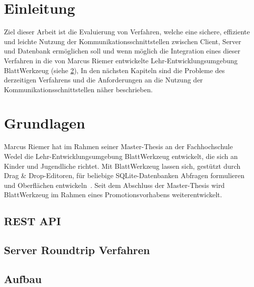
\chapter{Einleitung}
\label{sec:requirements}

Ziel dieser Arbeit ist die Evaluierung von Verfahren, welche eine sichere, effiziente und leichte Nutzung der Kommunikationsschnittstellen 
zwischen Client, Server und Datenbank ermöglichen soll und wenn möglich die Integration eines dieser Verfahren
in die von Marcus Riemer entwickelte Lehr-Entwicklungsumgebung BlattWerkzeug (siehe \ref{sec:requirements:existing}), 
In den nächsten Kapiteln sind die Probleme des derzeitigen Verfahrens und die Anforderungen an die Nutzung der Kommunikationsschnittstellen näher beschrieben.

\chapter{Grundlagen}
\label{sec:requirements:existing}

Marcus Riemer hat im Rahmen seiner Master-Thesis an der Fachhochschule Wedel die Lehr-Entwicklungsumgebung BlattWerkzeug entwickelt,
die sich an Kinder und Jugendliche richtet. Mit BlattWerkzeug lassen sich, gestützt durch Drag \& Drop-Edi\-toren,
für beliebige SQLite-Datenbanken Abfragen formulieren und Oberflächen entwickeln~\cite[2]{riemer2016}.
Seit dem Abschluss der Master-Thesis wird BlattWerkzeug im Rahmen eines Promotionsvorhabens weiterentwickelt. 
\section{REST API}
\section{Server Roundtrip Verfahren}
\section{Aufbau}

